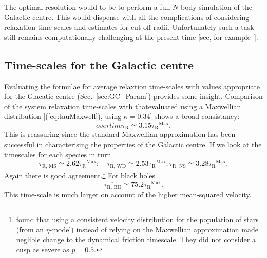 \documentclass[useAMS,usedcolumn,usegraphicx,usenatbib]{mn2e}
\newcommand{\eqnref}[1]{(\ref{eq:#1})}
\newcommand{\secref}[1]{Sec.~\ref{sec:#1}}
\newcommand{\sub}[1]{\ensuremath{_\mathrm{#1}}}
\newcommand{\super}[1]{\ensuremath{^\mathrm{#1}}}
\begin{document}
\begin{onecolumn}
The optimal resolution would to be to perform a full $N$-body simulation of the Galactic centre. This would dispense with all the complications of considering relaxation time-scales and estimates for cut-off radii. Unfortunately such a task still remains computationally challenging at the present time [see, for example~\citet{Li2012}].

\subsection{Time-scales for the Galactic centre}

Evaluating the formulae for average relaxtion time-scales with values appropriate for the Glacatic centre (\secref{GC_Param}) provides some insight. Comparison of the system relaxation time-scales with thatevaluated using a Maxwellian distribution [\eqnref{tauMaxwell}, using $\kappa = 0.34$] shows a broad consistancy:
\begin{equation}
overline{\tau\sub{R}} \simeq 3.15 \tau\sub{R}\super{Max}.
\end{equation}
This is reassuring since the standard Maxwellian approximation has been successful in characterising the properties of the Galactic centre. If we look at the timescales for each species in turn
\begin{equation}
\overline{\tau\sub{R,\,MS}} \simeq 2.62 \tau\sub{R}\super{Max};\quad \overline{\tau\sub{R,\,WD}} \simeq 2.53 \tau\sub{R}\super{Max}; \overline{\tau\sub{R,\,NS}} \simeq 3.28 \tau\sub{R}\super{Max}.
\end{equation}
Again there is good agreement.\footnote{\citet*{Freitag2006a} found that using a consistent velocity distribution for the population of stars (from an $\eta$-model) instead of relying on the Maxwellian approximation made neglible change to the dynamical friction timescale. They did not consider a cusp as severe as $p = 0.5$.} For black holes
\begin{equation}
\overline{\tau\sub{R,\,BH}} \simeq 75.2 \tau\sub{R}\super{Max}.
\end{equation}
This time-scale is much larger on account of the higher mean-squared velocity.


\end{onecolumn}
\end{document}
